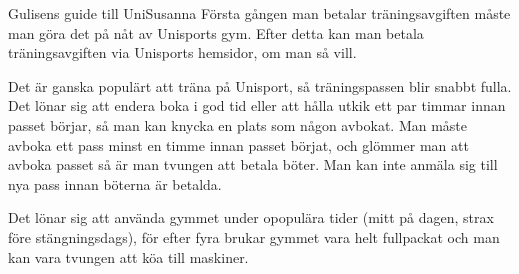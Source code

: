 \documentclass{spektraklet}
\begin{document}
\begin{artikel}{Gulisens guide till Uni}{Susanna}
Första gången man betalar träningsavgiften måste man göra det på nåt av Unisports gym. Efter detta kan man betala träningsavgiften via Unisports hemsidor, om man så vill.
 
Det är ganska populärt att träna på Unisport, så träningspassen blir snabbt fulla. Det lönar sig att endera boka i god tid eller att hålla utkik ett par timmar innan passet börjar, så man kan knycka en plats som någon avbokat. Man måste avboka ett pass minst en timme innan passet börjat, och glömmer man att avboka passet så är man tvungen att betala böter. Man kan inte anmäla sig till nya pass innan böterna är betalda. 

Det lönar sig att använda gymmet under opopulära tider (mitt på dagen, strax före stängningsdags), för efter fyra brukar gymmet vara helt fullpackat och man kan vara tvungen att köa till maskiner.

\end{artikel}
\end{document}
